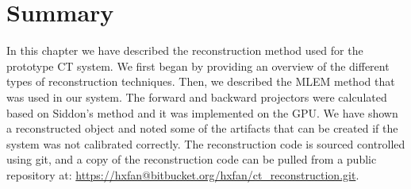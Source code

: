\section{Summary}
In this chapter we have described the reconstruction method used for the prototype CT system.  We first began by providing an overview of the different types of reconstruction techniques.  Then, we described the MLEM method that was used in our system.  The forward and backward projectors were calculated based on Siddon's method and it was implemented on the GPU.  We have shown a reconstructed object and noted some of the artifacts that can be created if the system was not calibrated correctly.  The reconstruction code is sourced controlled using git, and a copy of the reconstruction code can be pulled from a public repository at: \url{https://hxfan@bitbucket.org/hxfan/ct_reconstruction.git}.




%




